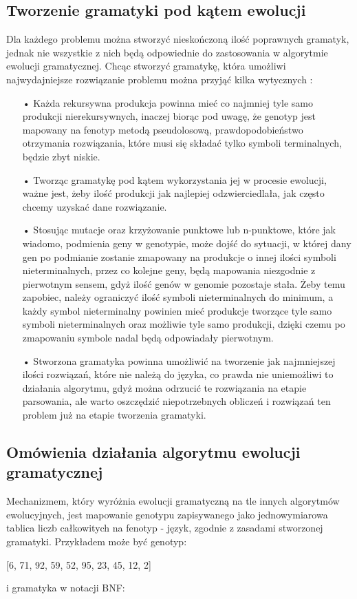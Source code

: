 \subsection{Tworzenie gramatyki pod kątem ewolucji}
\label{grammarCreation}
Dla każdego problemu można stworzyć nieskończoną ilość poprawnych gramatyk, jednak nie wszystkie z nich będą odpowiednie do zastosowania w algorytmie ewolucji gramatycznej. Chcąc stworzyć gramatykę, która umożliwi najwydajniejsze rozwiązanie problemu można przyjąć kilka wytycznych \cite{grammarDesign}: 
\begin{itemize}
  \item[•] Każda rekursywna produkcja powinna mieć co najmniej tyle samo produkcji nierekursywnych, inaczej biorąc pod uwagę, że genotyp jest mapowany na fenotyp metodą pseudolosową, prawdopodobieństwo otrzymania rozwiązania, które musi się składać tylko symboli terminalnych, będzie zbyt niskie.
  \item[•] Tworząc gramatykę pod kątem wykorzystania jej w procesie ewolucji, ważne jest, żeby ilość produkcji jak najlepiej odzwierciedlała, jak często chcemy uzyskać dane rozwiązanie.
  \item[•] Stosując mutacje oraz krzyżowanie punktowe lub n-punktowe, które jak wiadomo, podmienia geny w genotypie, może dojść do sytuacji, w której dany gen po podmianie zostanie zmapowany na produkcje o innej ilości symboli nieterminalnych, przez co kolejne geny, będą mapowania niezgodnie z pierwotnym sensem, gdyż ilość genów w genomie pozostaje stała. Żeby temu zapobiec, należy ograniczyć ilość symboli nieterminalnych do minimum, a każdy symbol nieterminalny powinien mieć produkcje tworzące tyle samo symboli nieterminalnych oraz możliwie tyle samo produkcji, dzięki czemu po zmapowaniu symbole nadal będą odpowiadały pierwotnym. 
  \item[•] Stworzona gramatyka powinna umożliwić na tworzenie jak najmniejszej ilości rozwiązań, które nie należą do języka, co prawda nie uniemożliwi to działania algorytmu, gdyż można odrzucić te rozwiązania na etapie parsowania, ale warto oszczędzić niepotrzebnych obliczeń i rozwiązań ten problem już na etapie tworzenia gramatyki. 
\end{itemize}

\subsection{Omówienia działania algorytmu ewolucji gramatycznej}
Mechanizmem, który wyróżnia ewolucji gramatyczną na tle innych algorytmów ewolucyjnych, jest mapowanie genotypu zapisywanego jako jednowymiarowa tablica liczb całkowitych na fenotyp - język, zgodnie z zasadami stworzonej gramatyki. Przykładem może być genotyp: 
\begin{center} [6, 71, 92, 59, 52, 95, 23, 45, 12, 2] \end{center}
i gramatyka w notacji BNF:


